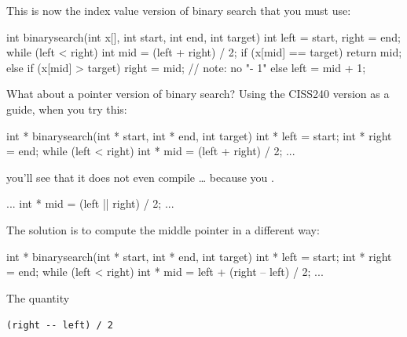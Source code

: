 This is now the index value version of binary search that you must use:

\begin{consolethree}[escapeinside=||]
int binarysearch(int x[], int start, int end,
                 int target)
{
    int left = start, right = end;
    while (left < right)
    {
        int mid = (left + right) / 2;
        if (x[mid] == target)
        {
            return mid;
        }
        else if (x[mid] > target)
        {
            right = mid; // note: no "- 1"
        }
        else
        {
            left = mid + 1;
        }
    }
}
\end{consolethree}

What about a pointer version of binary search? Using the CISS240 version as a guide, when you try this:

\begin{consolethree}[escapeinside=||]
int * binarysearch(int * start, int * end,
                   int target)
{
    int * left = start;
    int * right = end;
    while (left < right)
    {
        int * mid = (left + right) / 2;
        ...
    }
}
\end{consolethree}

you'll see that it does not even compile \ldots{} because you .

\begin{consolethree}[escapeinside=||]
...
int * mid = (left |\EMPHASIZE{ +}| right) / 2;
...
\end{consolethree}

The solution is to compute the middle pointer in a different way:

\begin{consolethree}[escapeinside=||]
int * binarysearch(int * start, int * end,
                   int target)
{
    int * left = start;
    int * right = end;
    while (left < right)
    {
        int * mid = left + (right -- left) / 2;
        ...
    }
}
\end{consolethree}

The quantity

\verb!(right -- left) / 2!

